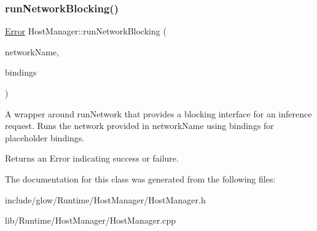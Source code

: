 \subsubsection{\texorpdfstring{run\+Network\+Blocking()}{runNetworkBlocking()}\hspace{0.1cm}{\footnotesize\ttfamily [2/2]}}
{\footnotesize\ttfamily \hyperlink{namespaceglow_afdb176c3a672ef66db0ecfc19a8d39bf}{Error} Host\+Manager\+::run\+Network\+Blocking (\begin{DoxyParamCaption}\item[{llvm\+::\+String\+Ref}]{network\+Name,  }\item[{\hyperlink{classglow_1_1_placeholder_bindings}{Placeholder\+Bindings} \&}]{bindings }\end{DoxyParamCaption})}

A wrapper around run\+Network that provides a blocking interface for an inference request. Runs the network provided in {\ttfamily network\+Name} using {\ttfamily bindings} for placeholder bindings. \begin{DoxyReturn}{Returns}
an Error indicating success or failure. 
\end{DoxyReturn}


The documentation for this class was generated from the following files\+:\begin{DoxyCompactItemize}
\item 
include/glow/\+Runtime/\+Host\+Manager/Host\+Manager.\+h\item 
lib/\+Runtime/\+Host\+Manager/Host\+Manager.\+cpp\end{DoxyCompactItemize}

